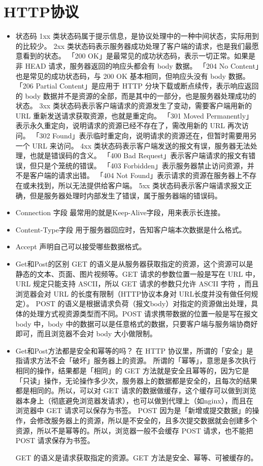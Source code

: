 \documentclass[11pt]{article}
\begin{document}
\section{HTTP协议}
\label{sec:orge2a4b20}
\begin{itemize}
\item 状态码
1xx 类状态码属于提示信息，是协议处理中的一种中间状态，实际用到的比较少。
2xx 类状态码表示服务器成功处理了客户端的请求，也是我们最愿意看到的状态。
「200 OK」是最常见的成功状态码，表示一切正常。如果是非 HEAD 请求，服务器返回的响应头都会有 body 数据。
「204 No Content」也是常见的成功状态码，与 200 OK 基本相同，但响应头没有 body 数据。
「206 Partial Content」是应用于 HTTP 分块下载或断点续传，表示响应返回的 body 数据并不是资源的全部，而是其中的一部分，也是服务器处理成功的状态。
3xx 类状态码表示客户端请求的资源发生了变动，需要客户端用新的 URL 重新发送请求获取资源，也就是重定向。
「301 Moved Permanently」表示永久重定向，说明请求的资源已经不存在了，需改用新的 URL 再次访问。
「302 Found」表示临时重定向，说明请求的资源还在，但暂时需要用另一个 URL 来访问。
4xx 类状态码表示客户端发送的报文有误，服务器无法处理，也就是错误码的含义。
「400 Bad Request」表示客户端请求的报文有错误，但只是个笼统的错误。
「403 Forbidden」表示服务器禁止访问资源，并不是客户端的请求出错。
「404 Not Found」表示请求的资源在服务器上不存在或未找到，所以无法提供给客户端。
5xx 类状态码表示客户端请求报文正确，但是服务器处理时内部发生了错误，属于服务器端的错误码。

\item Connection 字段
最常用的就是Keep-Alive字段，用来表示长连接。
\item Content-Type字段
用于服务器回应时，告知客户端本次数据是什么格式。
\item Accept
声明自己可以接受哪些数据格式。
\item Get和Post的区别
GET 的语义是从服务器获取指定的资源，这个资源可以是静态的文本、页面、图片视频等。GET 请求的参数位置一般是写在 URL 中，URL 规定只能支持 ASCII，所以 GET 请求的参数只允许 ASCII 字符 ，而且浏览器会对 URL 的长度有限制（HTTP协议本身对 URL长度并没有做任何规定）。
POST 的语义是根据请求负荷（报文body）对指定的资源做出处理，具体的处理方式视资源类型而不同。POST 请求携带数据的位置一般是写在报文 body 中，body 中的数据可以是任意格式的数据，只要客户端与服务端协商好即可，而且浏览器不会对 body 大小做限制。
\item Get和Post方法都是安全和幂等的吗？
在 HTTP 协议里，所谓的「安全」是指请求方法不会「破坏」服务器上的资源。
所谓的「幂等」，意思是多次执行相同的操作，结果都是「相同」的
GET 方法就是安全且幂等的，因为它是「只读」操作，无论操作多少次，服务器上的数据都是安全的，且每次的结果都是相同的。所以，可以对 GET 请求的数据做缓存，这个缓存可以做到浏览器本身上（彻底避免浏览器发请求），也可以做到代理上（如nginx），而且在浏览器中 GET 请求可以保存为书签。
POST 因为是「新增或提交数据」的操作，会修改服务器上的资源，所以是不安全的，且多次提交数据就会创建多个资源，所以不是幂等的。所以，浏览器一般不会缓存 POST 请求，也不能把 POST 请求保存为书签。

GET 的语义是请求获取指定的资源。GET 方法是安全、幂等、可被缓存的。
\end{itemize}
\end{document}
